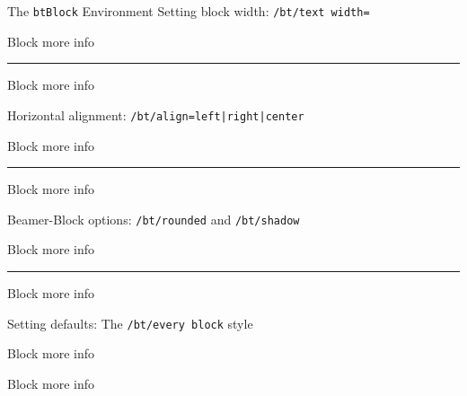 \documentclass{beamer}
\def\key#1{{\color{black!50}\texttt{/bt/#1}}}
\begin{document}
\begin{frame}{The \texttt{btBlock} Environment}
          \ei
        \ii Setting block width: \key{text width=}\par
\begin{LTXexample}[pos=b]
\begin{btBlock}[text width=5cm]{Block}
  more info
\end{btBlock}
\end{LTXexample}
\hrule
\par
\begin{LTXexample}[pos=b]
\begin{btBlock}[text width=0.8\textwidth]{Block}
  more info
\end{btBlock}
\end{LTXexample}

        \ii Horizontal alignment: \key{align=left|right|center}\par
\begin{LTXexample}[pos=b]
\begin{btBlock}[text width=0.8\textwidth,align=right]{Block}
  more info
\end{btBlock}
\end{LTXexample}
\hrule
\par
\begin{LTXexample}[pos=b]
\begin{btBlock}[scale=0.8, align=center]{Block}
  more info
\end{btBlock}
\end{LTXexample}

        \ii Beamer-Block options: \key{rounded} and \key{shadow}\par
\begin{LTXexample}[pos=r]
\begin{btBlock}[shadow=false]{Block}
  more info
\end{btBlock}
\end{LTXexample}
\hrule
\par
\begin{LTXexample}[pos=r]
\begin{btBlock}[rounded=false]{Block}
  more info
\end{btBlock}
\end{LTXexample}
        \ii Setting defaults: The \key{every block} style 

\begin{LTXexample}[pos=r]
\begin{btBlock}{Block}
  more info
\end{btBlock}

\bigskip

\begin{btBlock}{Block}
  more info
\end{btBlock}
\end{LTXexample}

  \ei
\end{frame}
\end{document}
